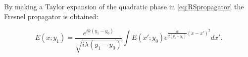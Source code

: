\documentclass{iucr}              %
\begin{document}
By making a Taylor expansion of the quadratic phase in \ref{eq:RSpropagator} the Fresnel propagator is obtained: 

\begin{equation}\label{eq:fresnelPropagator}
E(x;y_1) =  \frac{e^{i k (y_1-y_0)}}{\sqrt{i \lambda (y_1-y_0)}} \int E(x';y_0) e^{ \frac{i k}{2 (y_1-y_0)}  (x-x')^2  }  dx'.
\end{equation}


%


%
\end{document}
